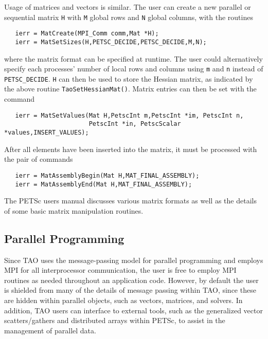 Usage of matrices and vectors is similar.  
The user can create a new parallel or sequential matrix \texttt{H} with 
\texttt{M} global rows and \texttt{N} global columns, with the routines
\begin{verbatim}
   ierr = MatCreate(MPI_Comm comm,Mat *H);
   ierr = MatSetSizes(H,PETSC_DECIDE,PETSC_DECIDE,M,N);
\end{verbatim}
\noindent
where the matrix format can be specified at runtime.  The user could
alternatively specify each processes' number of local rows and columns
using \texttt{m} and \texttt{n} instead of \texttt{PETSC\_DECIDE}.  
\texttt{H} can then be used to store
the Hessian matrix, as indicated by the above routine
\texttt{TaoSetHessianMat()}.  Matrix entries can then be set with the
command
\begin{verbatim}
   ierr = MatSetValues(Mat H,PetscInt m,PetscInt *im, PetscInt n,
                       PetscInt *in, PetscScalar *values,INSERT_VALUES);
\end{verbatim}
\noindent
After %
all elements have been inserted into the
matrix, it must be processed with the pair of commands
\begin{verbatim}
   ierr = MatAssemblyBegin(Mat H,MAT_FINAL_ASSEMBLY);
   ierr = MatAssemblyEnd(Mat H,MAT_FINAL_ASSEMBLY);
\end{verbatim}
\noindent
The PETSc users manual discusses various matrix formats as
well as the details of some basic matrix manipulation routines.

\subsection*{Parallel Programming}

Since TAO uses the message-passing model for parallel programming and
employs MPI for all interprocessor communication, the user is free to
employ MPI routines as needed throughout an application code.
However, by default the user is shielded from many of the details of
message passing within TAO, since these are hidden within parallel
objects, such as vectors, matrices, and solvers.  In addition, TAO
users can interface to external tools, such as the generalized vector
scatters/gathers and distributed arrays within PETSc, to assist in the
management of parallel data.

